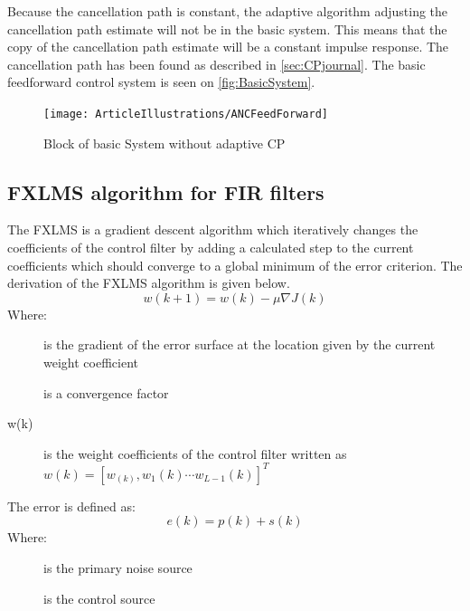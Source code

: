 Because the cancellation path is constant, the adaptive algorithm adjusting the cancellation path estimate will not be in the basic system. This means that the copy of the cancellation path estimate will be a constant impulse response. The cancellation path has been found as described in \autoref{sec:CPjournal}. The basic feedforward control system is seen on \autoref{fig:BasicSystem}. 

\begin{figure}[H]
	\centering
	\texttt{[image: ArticleIllustrations/ANCFeedForward]}
	\caption{Block of basic System without adaptive CP}
	\label{fig:BasicSystem}
\end{figure}   






\subsection{FXLMS algorithm for FIR filters}\label{subsec:fxlms}
The FXLMS is a gradient descent algorithm which iteratively changes the coefficients of the control filter by adding a calculated step to the current coefficients which should converge to a global minimum of the error criterion. The derivation of the FXLMS algorithm is given below. 
\begin{equation}\label{eq:FXLMSNewCoef}
w(k+1) = w(k) - \mu\nabla J(k)
\end{equation}
Where:
\begin{description}
	\item[] is the gradient of the error surface at the location given by the current weight coefficient
	\item[\text{$\mu$}] is a convergence factor
	\item[w(k)] is the weight coefficients of the control filter written as  $w(k)=[w_(k),w_1(k) \cdots w_{L-1}(k)]^T$
\end{description}
The error is defined as:
\begin{equation}\label{eq:FXLMSError}
e(k) = p(k) + s(k)
\end{equation}
Where:
\begin{description}
	\item[] is the primary noise source
	\item[] is the control source
\end{description}

